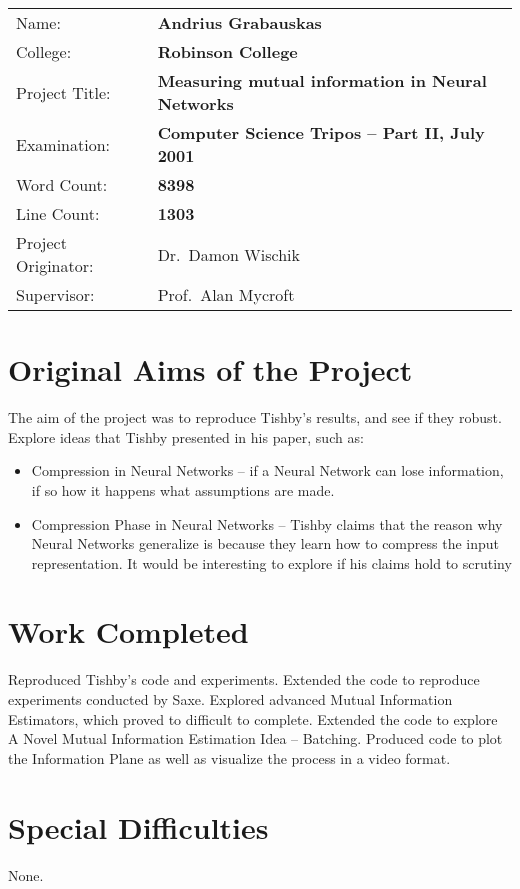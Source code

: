 \documentclass[dissertation.tex]{subfiles}
\begin{document}
{\large
\begin{tabular}{ll}
Name:               & \bf Andrius Grabauskas                    \\
College:            & \bf Robinson College                      \\
Project Title:      & \bf Measuring mutual information in Neural Networks \\
Examination:        & \bf Computer Science Tripos -- Part II, July 2001  \\
Word Count:         & \bf 8398\footnotemark[1] \\
Line Count:         & \bf 1303\footnotemark[2] \\
Project Originator: & Dr.\ Damon Wischik                  \\
Supervisor:         & Prof.\ Alan Mycroft                 \\ 
\end{tabular}
}


\section*{Original Aims of the Project}

The aim of the project was to reproduce Tishby's results, and see if they
robust. Explore ideas that Tishby presented in his paper, such as: 
\begin{itemize}
  \item{
      Compression in Neural Networks -- if a Neural Network can lose
      information, if so how it happens what assumptions are made.
    }
  \item{
      Compression Phase in Neural Networks -- Tishby claims that the reason why
      Neural Networks generalize is because they learn how to compress the input
      representation. It would be interesting to explore if his claims hold to
      scrutiny
    }
\end{itemize}

\section*{Work Completed}

Reproduced Tishby's code and experiments. Extended the code to reproduce
experiments conducted by Saxe. Explored advanced Mutual Information Estimators,
which proved to difficult to complete. Extended the code to explore A Novel
Mutual Information Estimation Idea -- Batching. Produced code to plot the
Information Plane as well as visualize the process in a video format.

\section*{Special Difficulties}

None.

\newpage
\end{document}
